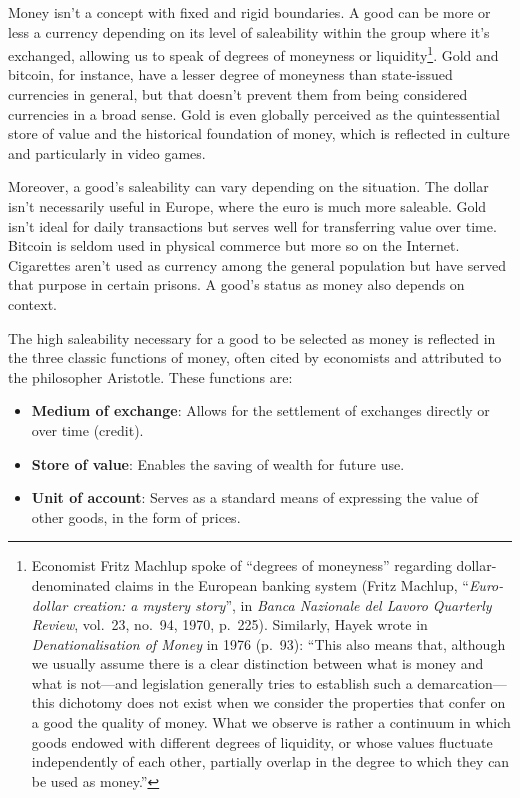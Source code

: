 \documentclass[
  a5paper,
  smalldemyvopaper,10pt,twoside,onecolumn,openright,extrafontsizes,hidelinks]{memoir}
\providecommand{\tightlist}{%
  \setlength{\itemsep}{0pt}\setlength{\parskip}{0pt}}\usepackage{longtable,booktabs,array}
\begin{document}
Money isn't a concept with fixed and rigid boundaries. A good can be
more or less a currency depending on its level of saleability within the
group where it's exchanged, allowing us to speak of degrees of moneyness
or liquidity\footnote{Economist Fritz Machlup spoke of ``degrees of
  moneyness'' regarding dollar-denominated claims in the European
  banking system (Fritz Machlup, ``\emph{Euro-dollar creation: a mystery
  story}'', in \emph{Banca Nazionale del Lavoro Quarterly Review},
  vol.~23, no.~94, 1970, p.~225). Similarly, Hayek wrote in
  \emph{Denationalisation of Money} in 1976 (p.~93): ``This also means
  that, although we usually assume there is a clear distinction between
  what is money and what is not---and legislation generally tries to
  establish such a demarcation---this dichotomy does not exist when we
  consider the properties that confer on a good the quality of money.
  What we observe is rather a continuum in which goods endowed with
  different degrees of liquidity, or whose values fluctuate
  independently of each other, partially overlap in the degree to which
  they can be used as money.''}. Gold and bitcoin, for instance, have a
lesser degree of moneyness than state-issued currencies in general, but
that doesn't prevent them from being considered currencies in a broad
sense. Gold is even globally perceived as the quintessential store of
value and the historical foundation of money, which is reflected in
culture and particularly in video games.

Moreover, a good's saleability can vary depending on the situation. The
dollar isn't necessarily useful in Europe, where the euro is much more
saleable. Gold isn't ideal for daily transactions but serves well for
transferring value over time. Bitcoin is seldom used in physical
commerce but more so on the Internet. Cigarettes aren't used as currency
among the general population but have served that purpose in certain
prisons. A good's status as money also depends on context.

The high saleability necessary for a good to be selected as money is
reflected in the three classic functions of money, often cited by
economists and attributed to the philosopher Aristotle. These functions
are:

\begin{itemize}
\tightlist
\item
  \textbf{Medium of exchange}: Allows for the settlement of exchanges
  directly or over time (credit).
\item
  \textbf{Store of value}: Enables the saving of wealth for future use.
\item
  \textbf{Unit of account}: Serves as a standard means of expressing the
  value of other goods, in the form of prices.
\end{itemize}
\end{document}
